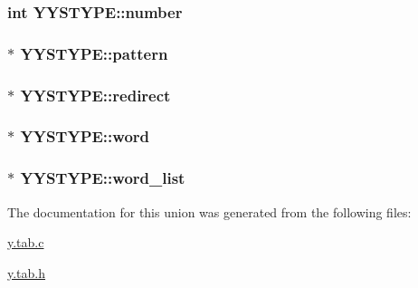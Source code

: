 \subsubsection[{\texorpdfstring{number}{number}}]{\setlength{\rightskip}{0pt plus 5cm}int Y\+Y\+S\+T\+Y\+P\+E\+::number}\hypertarget{unionYYSTYPE_a240bd0051381dcdbd03b9c3764570b93}{}\label{unionYYSTYPE_a240bd0051381dcdbd03b9c3764570b93}
\subsubsection[{\texorpdfstring{pattern}{pattern}}]{ $\ast$ Y\+Y\+S\+T\+Y\+P\+E\+::pattern}\hypertarget{unionYYSTYPE_abf7ad756ffb663853f56047bcfed8a55}{}\label{unionYYSTYPE_abf7ad756ffb663853f56047bcfed8a55}
\subsubsection[{\texorpdfstring{redirect}{redirect}}]{ $\ast$ Y\+Y\+S\+T\+Y\+P\+E\+::redirect}\hypertarget{unionYYSTYPE_aa0010a419e6ecb1a506d7ff004462712}{}\label{unionYYSTYPE_aa0010a419e6ecb1a506d7ff004462712}
\subsubsection[{\texorpdfstring{word}{word}}]{ $\ast$ Y\+Y\+S\+T\+Y\+P\+E\+::word}\hypertarget{unionYYSTYPE_a8cc77cd40d569fa92c917c3e11a5e4bb}{}\label{unionYYSTYPE_a8cc77cd40d569fa92c917c3e11a5e4bb}
\subsubsection[{\texorpdfstring{word\+\_\+list}{word_list}}]{ $\ast$ Y\+Y\+S\+T\+Y\+P\+E\+::word\+\_\+list}\hypertarget{unionYYSTYPE_aaa247cc53b81b682e2a02cb246fa2e5f}{}\label{unionYYSTYPE_aaa247cc53b81b682e2a02cb246fa2e5f}


The documentation for this union was generated from the following files\+:\begin{DoxyCompactItemize}
\item 
\hyperlink{y_8tab_8c}{y.\+tab.\+c}\item 
\hyperlink{y_8tab_8h}{y.\+tab.\+h}\end{DoxyCompactItemize}
